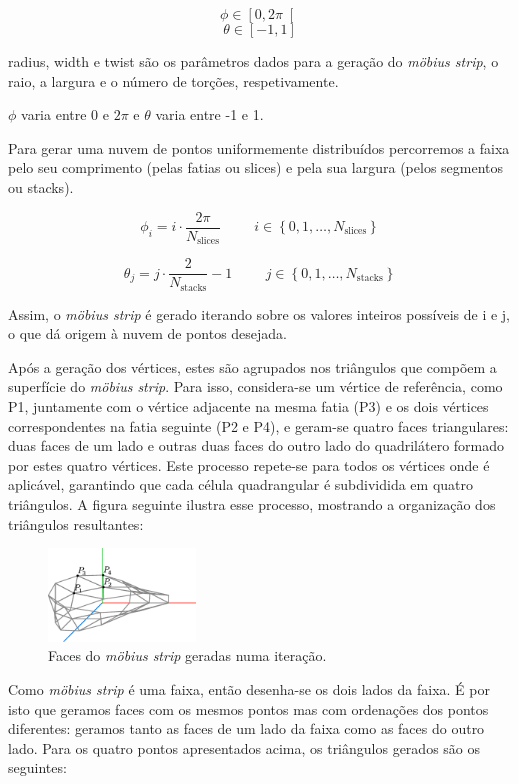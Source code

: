 \documentclass[12pt, a4paper]{article}
\begin{document}
$$\phi \in \left [ 0, 2 \pi \right [$$
$$\theta \in \left [ -1, 1 \right ]$$

radius, width e twist são os parâmetros dados para a geração do \emph{möbius strip}, o raio, a
largura e o número de torções, respetivamente.

$\phi$ varia entre 0 e $2 \pi$ e $\theta$ varia entre -1 e 1.

Para gerar uma nuvem de pontos uniformemente distribuídos percorremos a faixa pelo seu comprimento
(pelas fatias ou slices) e pela sua largura (pelos segmentos ou stacks).

$$
\phi_i = i \cdot \frac{2\pi}{N_\text{slices}}
\hspace{1cm}
i \in \left \lbrace 0, 1, \ldots, N_\text{slices} \right \rbrace
$$

$$
\theta_j = j \cdot \frac{2}{N_\text{stacks}} -1
\hspace{1cm}
j \in \left \lbrace 0, 1, \ldots, N_\text{stacks} \right \rbrace
$$

Assim, o \emph{möbius strip} é gerado iterando sobre os valores inteiros possíveis de i e j,
o que dá origem à nuvem de pontos desejada.

Após a geração dos vértices, estes são agrupados nos triângulos que compõem a superfície do
\emph{möbius strip}.
Para isso, considera-se um vértice de referência, como P1, juntamente com o vértice
adjacente na mesma fatia (P3) e os dois vértices correspondentes na fatia seguinte (P2 e P4),
e geram-se quatro faces triangulares: duas faces de um lado e outras duas faces do outro lado
do quadrilátero formado por estes quatro vértices. Este processo repete-se para todos os vértices
onde é aplicável, garantindo que cada célula quadrangular é subdividida em quatro triângulos.
A figura seguinte ilustra esse processo, mostrando a organização dos triângulos resultantes:

\begin{figure}[H]
    \centering
    \includegraphics[width=0.35\textwidth]{res/phase2/figures/MobiusStrip.pdf}
    \caption{Faces do \emph{möbius strip} geradas numa iteração.}
\end{figure}

Como \emph{möbius strip} é uma faixa, então desenha-se os dois lados da faixa. É por
isto que geramos faces com os mesmos pontos mas com ordenações dos pontos diferentes:
geramos tanto as faces de um lado da faixa como as faces do outro lado.
Para os quatro pontos apresentados acima, os triângulos gerados são os seguintes:
\end{document}
